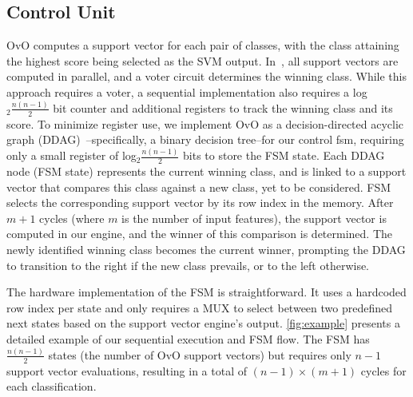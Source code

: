 \subsection{Control Unit} \label{sec:control_unit}
OvO computes a support vector for each pair of classes, with the class attaining the highest score being selected as the SVM output.
In~\cite{Armeniakos:DATE2022:axml,Armeniakos:TCAD2023:cross}, all support vectors are computed in parallel, and a voter circuit determines the winning class.
While this approach requires a voter, a sequential implementation also requires a log$_2\frac{n(n-1)}{2}$ bit counter and additional registers to track the winning class and its score.
To minimize register use, we implement OvO as a decision-directed acyclic graph (DDAG)~\cite{ovo}--specifically, a binary decision tree--for our control \gls{fsm}, requiring only a small register of log$_2\frac{n(n-1)}{2}$ bits to store the FSM state.
Each DDAG node (FSM state) represents the current winning class, and is linked to a support vector that compares this class against a new class, yet to be considered.
FSM selects the corresponding support vector by its row index in the memory.
After $m+1$ cycles (where $m$ is the number of input features), the support vector is computed in our engine, and the winner of this comparison is determined.
The newly identified winning class becomes the current winner, prompting the DDAG to transition to the right if the new class prevails, or to the left otherwise.

The hardware implementation of the FSM is straightforward.
It uses a hardcoded row index per state and only requires a MUX to select between two predefined next states based on the support vector engine's output.
\cref{fig:example} presents a detailed example of our sequential execution and FSM flow.
The FSM has $\frac{n(n-1)}{2}$ states (the number of OvO support vectors) but requires only $n-1$ support vector evaluations, resulting in a total of $(n-1) \times (m+1)$ cycles for each classification.






